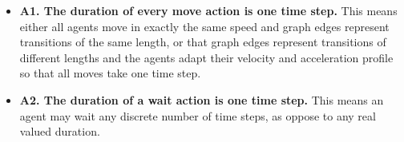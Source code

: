 \documentclass[review]{elsarticle}
\newcommand\roni[1]{\nb{\textbf{Roni:}}{green}{#1}}
\newcommand\dor[1]{\nb{\textbf{Dor:}}{Fuchsia}{#1}}
\begin{document}
\begin{itemize}
    \item \textbf{A1. The duration of every move action is one time step.} 
    This means either all agents move in exactly the same speed and graph edges represent transitions of the same length,
    or that graph edges represent transitions of different lengths and the agents adapt their velocity and acceleration profile so that all moves take one time step. 
    \item \textbf{A2. The duration of a wait action is one time step.} 
    This means an agent may wait any discrete number of time steps, as oppose to any real valued duration. 

\end{itemize}
\end{document}
